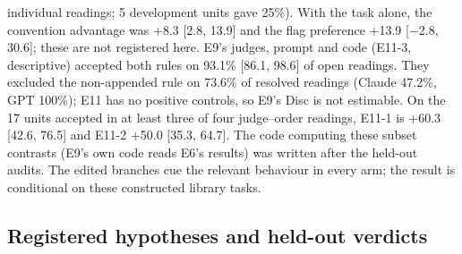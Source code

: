 individual readings; 5 development units gave 25\%). With the task alone, the convention advantage was
+8.3 [2.8, 13.9] and the flag preference +13.9 [$-$2.8, 30.6]; these are not registered here. E9's
judges, prompt and code (E11-3, descriptive) accepted both rules on 93.1\% [86.1, 98.6] of open readings.
They excluded the non-appended rule on 73.6\% of resolved readings (Claude 47.2\%, GPT 100\%); E11 has no
positive controls, so E9's Disc is not estimable. On the 17 units accepted in at least three of four
judge--order readings, E11-1 is +60.3 [42.6, 76.5] and E11-2 +50.0 [35.3, 64.7]. The code computing these
subset contrasts (E9's own code reads E6's results) was written after the held-out audits. The edited
branches cue the relevant behaviour in every arm; the result is conditional on these constructed library
tasks.

\subsection{Registered hypotheses and held-out verdicts}

